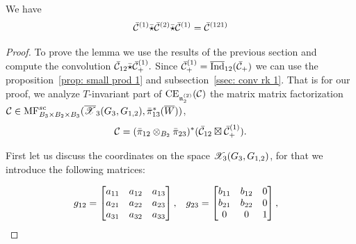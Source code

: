 \begin{lemma} We have
$$\bar{\mathcal{C}}^{(1)}\bar{\star}\bar{\mathcal{C}}^{(2)}\bar{\star}\bar{\mathcal{C}}^{(1)}=\bar{\mathcal{C}}^{(121)}$$
\end{lemma}
\begin{proof}
To prove the lemma we use the results of the previous section and compute the convolution
$ \bar{\mathcal{C}}_{12}\bar{\star}\bar{\mathcal{C}}^{(1)}_+.$
Since $\bar{\mathcal{C}}^{(1)}_+=\overline{\mathrm{Ind}}_{12}(\bar{\mathcal{C}}_+)$ we can use the proposition~\ref{prop: small prod 1}  and subsection~\ref{ssec: conv rk 1}.
That is for our proof,  we  analyze $T$-invariant part of $\mathrm{CE}_{\mathfrak{n}^{(2)}_2}(\mathcal{C})$ the matrix matrix factorization $\mathcal{C}\in \mathrm{MF}^{sc}_{B_3\times B_2\times B_3}(\overline{\mathscr{X}}_3(G_3,G_{1,2}),\bar{\pi}_{13}^*(\overline{W}))$,
$$\mathcal{C}=(\bar{\pi}_{12}\otimes_{B_2}\bar{\pi}_{23})^*(\bar{\mathcal{C}}_{12}\boxtimes\bar{\mathcal{C}}^{(1)}_+).$$

\def\hA{\hat{A}}
\def\adhA{\mathop{\mathrm{adj}} \hA }
\def\vcw{ \vec{w}}

First let us discuss the coordinates on the space $\mathscr{X}_3(G_3,G_{1,2})$, for that we introduce the following matrices:

\begin{align*}
\xgot & = \xbmtr{\exaoo & \exaot & \exaoh\\ \exato & \exatt & \exath \\ \exaho & \exaht & \exahh}, &
\xgth &= \xbmtr{ \exboo & \exbot & 0 \\ \exbto & \exbtt & 0 \\ 0 & 0 & 1},   %
\end{align*}


\end{proof}
